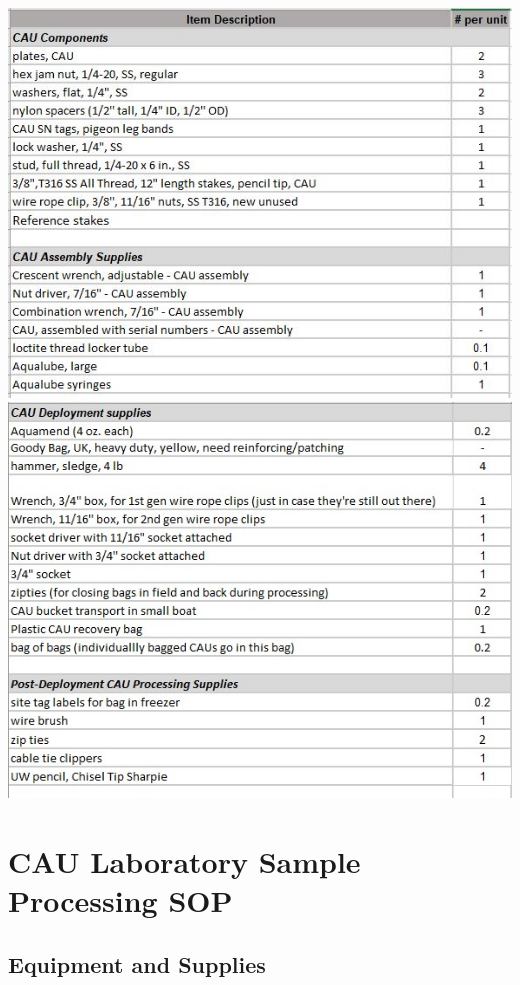 \documentclass[
]{book}
\begin{document}
\includegraphics{images/AssemblyEquipment1.jpg}
\includegraphics{images/AssemblyEquipment2.jpg}

\hypertarget{cau-laboratory-sample-processing-sop}{%
\section{CAU Laboratory Sample Processing SOP}\label{cau-laboratory-sample-processing-sop}}

\hypertarget{equipment-and-supplies-1}{%
\subsection{Equipment and Supplies}\label{equipment-and-supplies-1}}
\end{document}

